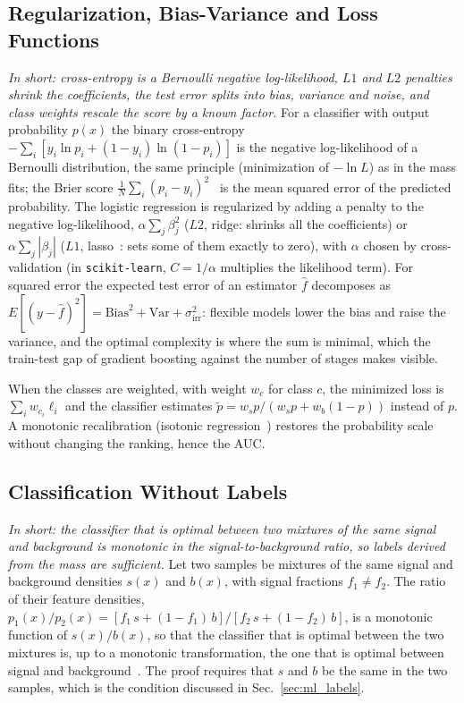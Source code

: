 \subsection{Regularization, Bias-Variance and Loss Functions}
\emph{In short: cross-entropy is a Bernoulli negative log-likelihood, $L1$ and $L2$ penalties shrink the coefficients, the test error splits into bias, variance and noise, and class weights rescale the score by a known factor.}
For a classifier with output probability $p(x)$ the binary cross-entropy $-\sum_i[y_i\ln p_i+(1-y_i)\ln(1-p_i)]$ is the negative log-likelihood of a Bernoulli distribution, the same principle (minimization of $-\ln L$) as in the mass fits; the Brier score $\frac1N\sum_i(p_i-y_i)^2$~\cite{brier} is the mean squared error of the predicted probability. The logistic regression is regularized by adding a penalty to the negative log-likelihood, $\alpha\sum_j\beta_j^2$ ($L2$, ridge: shrinks all the coefficients) or $\alpha\sum_j|\beta_j|$ ($L1$, lasso~\cite{tibshirani_lasso}: sets some of them exactly to zero), with $\alpha$ chosen by cross-validation (in \texttt{scikit-learn}, $C=1/\alpha$ multiplies the likelihood term). For squared error the expected test error of an estimator $\hat f$ decomposes as $E[(y-\hat f)^2]=\mathrm{Bias}^2+\mathrm{Var}+\sigma^2_{\mathrm{irr}}$: flexible models lower the bias and raise the variance, and the optimal complexity is where the sum is minimal, which the train-test gap of gradient boosting against the number of stages makes visible.

When the classes are weighted, with weight $w_c$ for class $c$, the minimized loss is $\sum_iw_{c_i}\ell_i$ and the classifier estimates $\tilde p=w_sp/(w_sp+w_b(1-p))$ instead of $p$. A monotonic recalibration (isotonic regression~\cite{zadrozny_elkan}) restores the probability scale without changing the ranking, hence the AUC.

\subsection{Classification Without Labels}
\emph{In short: the classifier that is optimal between two mixtures of the same signal and background is monotonic in the signal-to-background ratio, so labels derived from the mass are sufficient.}
Let two samples be mixtures of the same signal and background densities $s(x)$ and $b(x)$, with signal fractions $f_1\neq f_2$. The ratio of their feature densities, $p_1(x)/p_2(x)=[f_1\,s+(1-f_1)\,b]/[f_2\,s+(1-f_2)\,b]$, is a monotonic function of $s(x)/b(x)$, so that the classifier that is optimal between the two mixtures is, up to a monotonic transformation, the one that is optimal between signal and background~\cite{cwola}. The proof requires that $s$ and $b$ be the same in the two samples, which is the condition discussed in Sec.~\ref{sec:ml_labels}.

